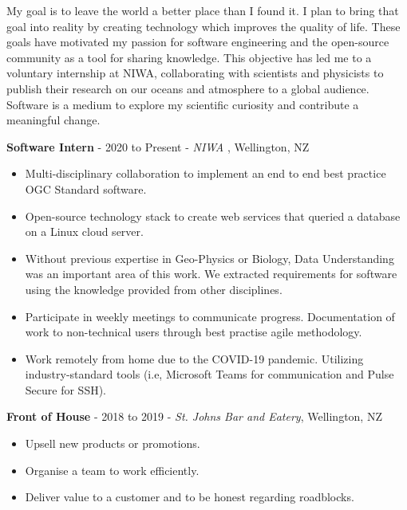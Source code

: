 \documentclass[9pt]{developercv}
\begin{document}
My goal is to leave the world a better place than I found it. I plan to bring that goal into reality by creating technology which improves the quality of life. These goals have motivated my passion for software engineering and the open-source community as a tool for sharing knowledge. This objective has led me to a voluntary internship at NIWA, collaborating with scientists and physicists to publish their research on our oceans and atmosphere to a global audience. Software is a medium to explore my scientific curiosity and contribute a meaningful change.



\textbf{Software Intern} - 2020 to Present - \emph{NIWA} , Wellington, NZ
\begin{itemize}
	\item Multi-disciplinary collaboration to implement an end to end best practice OGC Standard software.
	\item Open-source technology stack to create web services that queried a database on a Linux cloud server.
	\item Without previous expertise in Geo-Physics or Biology, Data Understanding was an important area of this work. We extracted requirements for software using the knowledge provided from other disciplines.
	\item Participate in weekly meetings to communicate progress. Documentation of work to non-technical users through best practise agile methodology.
	\item Work remotely from home due to the COVID-19 pandemic. Utilizing industry-standard tools (i.e, Microsoft Teams for communication and Pulse Secure for SSH).
\end{itemize}

\textbf{Front of House} - 2018 to 2019 - \emph{St. Johns Bar and Eatery}, Wellington, NZ
\begin{itemize}
	\item Upsell new products or promotions.
	\item Organise a team to work efficiently.
	\item Deliver value to a customer and to be honest regarding roadblocks.
\end{itemize}
\end{document}
